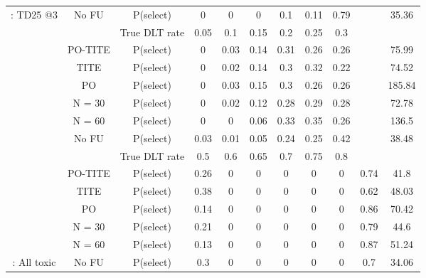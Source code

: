 \begin{table}
\begin{singlespace}
{\begin{tabular}[t]{ccccccccccc}
			\multirow{-7}{*}{\centering\arraybackslash 6: TD25 @3} & No FU & P(select) & 0 & 0 & 0 & 0.1 & 0.11 & 0.79 &  & 35.36\\
			\cmidrule{1-11}
			\rowcolor{gray!6}   &  & True DLT rate & 0.05 & 0.1 & 0.15 & 0.2 & 0.25 & 0.3 &  & \\
			
			\rowcolor{gray!6}   & PO-TITE & P(select) & 0 & 0.03 & 0.14 & 0.31 & 0.26 & 0.26 &  & 75.99\\
			
			\rowcolor{gray!6}   & TITE & P(select) & 0 & 0.02 & 0.14 & 0.3 & 0.32 & 0.22 &  & 74.52\\
			
			\rowcolor{gray!6}   & PO & P(select) & 0 & 0.03 & 0.15 & 0.3 & 0.26 & 0.26 &  & 185.84\\
			
			\rowcolor{gray!6}   & N = 30 & P(select) & 0 & 0.02 & 0.12 & 0.28 & 0.29 & 0.28 &  & 72.78\\
			
			\rowcolor{gray!6}   & N = 60 & P(select) & 0 & 0 & 0.06 & 0.33 & 0.35 & 0.26 &  & 136.5\\
			
			\rowcolor{gray!6}  \multirow{-7}{*}{\centering\arraybackslash 7: Equal steps} & No FU & P(select) & 0.03 & 0.01 & 0.05 & 0.24 & 0.25 & 0.42 &  & 38.48\\
			\cmidrule{1-11}
			&  & True DLT rate & 0.5 & 0.6 & 0.65 & 0.7 & 0.75 & 0.8 &  & \\
			
			& PO-TITE & P(select) & 0.26 & 0 & 0 & 0 & 0 & 0 & 0.74 & 41.8\\
			
			& TITE & P(select) & 0.38 & 0 & 0 & 0 & 0 & 0 & 0.62 & 48.03\\
			
			& PO & P(select) & 0.14 & 0 & 0 & 0 & 0 & 0 & 0.86 & 70.42\\
			
			& N = 30 & P(select) & 0.21 & 0 & 0 & 0 & 0 & 0 & 0.79 & 44.6\\
			
			& N = 60 & P(select) & 0.13 & 0 & 0 & 0 & 0 & 0 & 0.87 & 51.24\\
			
			\multirow{-7}{*}{\centering\arraybackslash 8: All toxic} & No FU & P(select) & 0.3 & 0 & 0 & 0 & 0 & 0 & 0.7 & 34.06\\
			\bottomrule
	\end{tabular}}
\end{singlespace}
\end{table}

